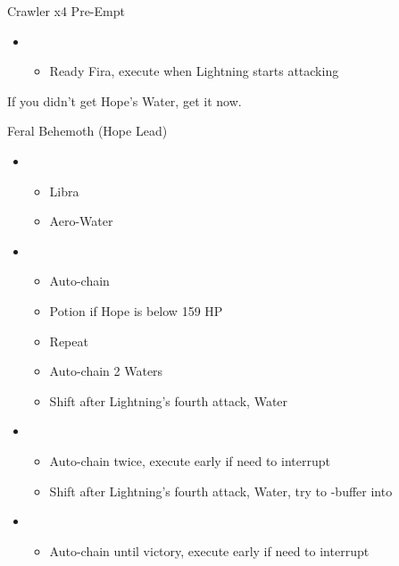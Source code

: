 	\begin{battle}[0:05]{Crawler x4 Pre-Empt}
		\begin{itemize}
			\item \first
			      \begin{itemize}
				      \item Ready Fira, execute when Lightning starts attacking
			      \end{itemize}
		\end{itemize}
	\end{battle}
	If you didn't get Hope's Water, get it now.
	\vfill
	\begin{battle}[0:40]{Feral Behemoth (Hope Lead)}
		\begin{itemize}
			\item \first
			      \begin{itemize}
				      \item Libra
				      \item Aero-Water
			      \end{itemize}
			\item \fourth
			      \begin{itemize}
				      \item Auto-chain
				      \item Potion if Hope is below 159 HP
				      \item Repeat
				      \item Auto-chain 2 Waters
				      \item Shift after Lightning's fourth attack, Water
			      \end{itemize}
			\item \fifth
			      \begin{itemize}
				      \item Auto-chain twice, execute early if need to interrupt
				      \item Shift after Lightning's fourth attack, Water, try to \com-buffer into
			      \end{itemize}
			\item \sixth
			      \begin{itemize}
				      \item Auto-chain until victory, execute early if need to interrupt
			      \end{itemize}
		\end{itemize}
	\end{battle}

